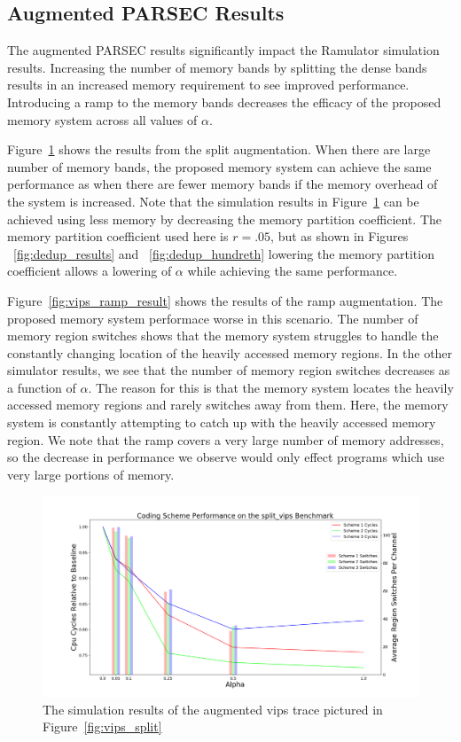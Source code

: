 \subsection{Augmented PARSEC Results}

The augmented PARSEC results significantly impact the Ramulator simulation results. Increasing the number of memory bands by splitting the dense bands results in an increased memory requirement to see improved performance. Introducing a ramp to the memory bands decreases the efficacy of the proposed memory system across all values of $\alpha$.

Figure~\ref{fig:vips_split_result} shows the results from the split augmentation. When there are large number of memory bands, the proposed memory system can achieve the same performance as when there are fewer memory bands if the memory overhead of the system is increased. Note that the simulation results in Figure~\ref{fig:vips_split_result} can be achieved using less memory by decreasing the memory partition coefficient. The memory partition coefficient used here is $r = .05$, but as shown in Figures ~\ref{fig:dedup_results} and ~\ref{fig:dedup_hundreth} lowering the memory partition coefficient allows a lowering of $\alpha$ while achieving the same performance.

Figure~\ref{fig:vips_ramp_result} shows the results of the ramp augmentation. The proposed memory system performace worse in this scenario. The number of memory region switches shows that the memory system struggles to handle the constantly changing location of the heavily accessed memory regions. In the other simulator results, we see that the number of memory region switches decreases as a function of $\alpha$. The reason for this is that the memory system locates the heavily accessed memory regions and rarely switches away from them. Here, the memory system is constantly attempting to catch up with the heavily accessed memory region. {\color{blue}We note that the ramp covers a very large number of memory addresses, so the decrease in performance we observe would only effect programs which use very large portions of memory.} 

\begin{figure}[htbp]
		\includegraphics[width=\linewidth]{fig/vips_split_results.png}
		\caption{The simulation results of the augmented vips trace pictured in Figure~\ref{fig:vips_split}}
		\label{fig:vips_split_result}
\end{figure}

